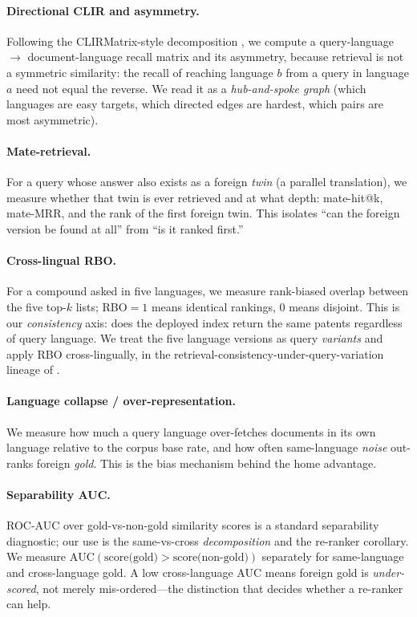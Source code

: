 \documentclass[11pt]{article}
\begin{document}
\paragraph{Directional CLIR and asymmetry.}
Following the CLIRMatrix-style decomposition \citep{clirmatrix2020}, we compute a
query-language $\rightarrow$ document-language recall matrix and its asymmetry,
because retrieval is not a symmetric similarity: the recall of reaching language
$b$ from a query in language $a$ need not equal the reverse. We read it as a
\emph{hub-and-spoke graph} (which languages are easy targets, which directed
edges are hardest, which pairs are most asymmetric).

\paragraph{Mate-retrieval.}
For a query whose answer also exists as a foreign \emph{twin} (a parallel
translation), we measure whether that twin is ever retrieved and at what depth:
mate-hit@k, mate-MRR, and the rank of the first foreign twin. This isolates
``can the foreign version be found at all'' from ``is it ranked first.''

\paragraph{Cross-lingual RBO.}
For a compound asked in five languages, we measure rank-biased overlap
\citep{rbo2010} between the five top-$k$ lists; RBO$=1$ means identical
rankings, $0$ means disjoint. This is our \emph{consistency} axis: does the
deployed index return the same patents regardless of query language. We treat
the five language versions as query \emph{variants} and apply RBO
cross-lingually, in the retrieval-consistency-under-query-variation lineage of
\citet{bailey2017consistency}.

\paragraph{Language collapse / over-representation.}
We measure how much a query language over-fetches documents in its own
language relative to the corpus base rate, and how often same-language
\emph{noise} out-ranks foreign \emph{gold}. This is the bias mechanism behind
the home advantage.

\paragraph{Separability AUC.}
ROC-AUC over gold-vs-non-gold similarity scores is a standard separability
diagnostic; our use is the same-vs-cross \emph{decomposition} and the re-ranker
corollary. We measure $\mathrm{AUC}(\text{score(gold)} > \text{score(non-gold)})$
separately for same-language and cross-language gold. A low cross-language AUC
means foreign gold is \emph{under-scored}, not merely mis-ordered---the
distinction that decides whether a re-ranker can help.
\end{document}
